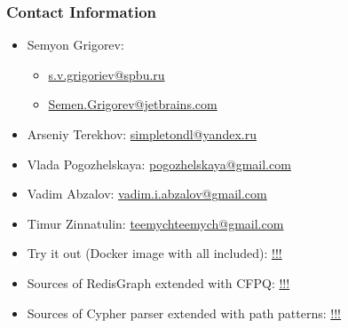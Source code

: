 \documentclass[xcolor=table,aspectratio=169]{beamer}
\begin{document}
\begin{frame}
\frametitle{Contact Information}
\begin{itemize}
  \item Semyon Grigorev:
    \begin{itemize}
      \item \href{mailto:s.v.grigoriev@spbu.ru}{s.v.grigoriev@spbu.ru}
      \item \href{mailto:Semen.Grigorev@jetbrains.com}{Semen.Grigorev@jetbrains.com}
    \end{itemize}

  \item Arseniy Terekhov: \href{mailto:simpletondl@yandex.ru}{simpletondl@yandex.ru}
  \item Vlada Pogozhelskaya: \href{mailto:pogozhelskaya@gmail.com}{pogozhelskaya@gmail.com}
  \item Vadim Abzalov: \href{mailto:vadim.i.abzalov@gmail.com}{vadim.i.abzalov@gmail.com}
  \item Timur Zinnatulin: \href{mailto:teemychteemych@gmail.com}{teemychteemych@gmail.com}

  \vspace{0.5cm}
  \item Try it out (Docker image with all included): \url{!!!}
  \item Sources of RedisGraph extended with CFPQ: \url{!!!}
  \item Sources of Cypher parser extended with path patterns: \url{!!!}
\end{itemize}
\vspace{0.1cm}
\end{frame}
\end{document}
